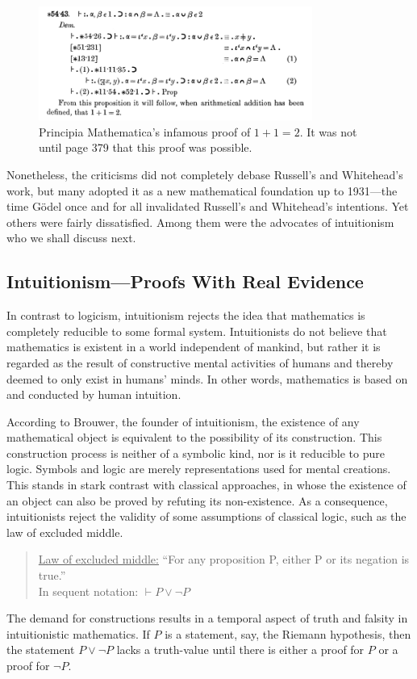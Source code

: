 \documentclass{article}
\begin{document}
\begin{figure}[h]
	\centering
	\includegraphics[width=0.8\textwidth]{img/principia_mathematica.png}
	\caption{Principia Mathematica's infamous proof of $1+1=2$. It was not until page 379 that this proof was possible.}
\end{figure}
Nonetheless, the criticisms did not completely debase Russell's and Whitehead's work, but many adopted it as a new mathematical foundation up to 1931---the time Gödel once and for all invalidated Russell's and Whitehead's intentions. Yet others were fairly dissatisfied. Among them were the advocates of intuitionism who we shall discuss next.

\subsection{Intuitionism---Proofs With Real Evidence}\label{ssec_intuitionism}
In contrast to logicism, intuitionism rejects the idea that mathematics is completely reducible to some formal system. Intuitionists do not believe that mathematics is existent in a world independent of mankind, but rather it is regarded as the result of constructive mental activities of humans and thereby deemed to only exist in humans' minds. In other words, mathematics is based on and conducted by human intuition.

According to Brouwer, the founder of intuitionism, the existence of any mathematical object is equivalent to the possibility of its construction.
This construction process is neither of a symbolic kind, nor is it reducible to pure logic. Symbols and logic are merely representations used for mental creations.
This stands in stark contrast with classical approaches, in whose the existence of an object can also be proved by refuting its non-existence. As a consequence, intuitionists reject the validity of some assumptions of classical logic, such as the law of excluded middle.
\begin{quote}
\underline{Law of excluded middle:} ``For any proposition P, either P or its negation is true.''\\ 
In sequent notation: $\vdash P\lor\lnot P$
\end{quote}
The demand for constructions results in a temporal aspect of truth and falsity in intuitionistic mathematics. If $P$ is a statement, say, the Riemann hypothesis, then the statement $P\lor\lnot P$ lacks a truth-value until there is either a proof for $P$ or a proof for $\lnot P$.
\end{document}
